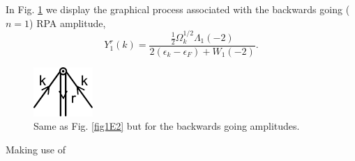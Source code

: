 In Fig. \ref{fig1E3} we display the graphical process associated with the backwards going ($n=1$) RPA amplitude,
\begin{equation*}
Y_1^r(k)=\frac{\frac{1}{2}\Omega_k^{1/2}\Lambda_1(-2)}{2(\epsilon_k-\epsilon_F)+W_1(-2)}.
\end{equation*}
  \begin{figure}
  \centerline{\includegraphics*[width=0.2\textwidth,angle=0]{nutshell/figs/removal_backward.pdf}}
  \caption[Pairing vibration backwards going amplitudes.]{ Same as Fig. \ref{fig1E2} but for the backwards going amplitudes.}\label{fig1E3}
  \end{figure}
  Making use of


